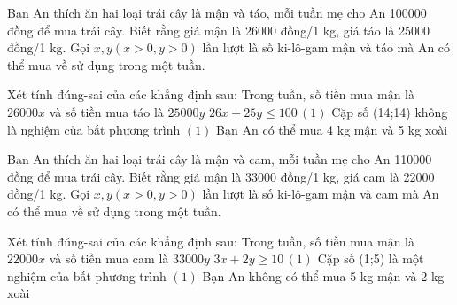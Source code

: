 \begin{ex}
 Bạn An thích ăn hai loại trái cây là mận và táo, mỗi tuần mẹ cho An 100000 đồng để mua trái cây. Biết rằng giá mận là 26000 đồng/1 kg, giá táo là 25000 đồng/1 kg. Gọi $x, y (x>0, y>0)$ lần lượt là số ki-lô-gam mận và táo mà An có thể mua về sử dụng trong một tuần.

 Xét tính đúng-sai của các khẳng định sau:
\choiceTFt
{ \True Trong tuần, số tiền mua mận là ${26000x}$ và số tiền mua táo là ${25000y}$ }
   { \True $26 x + 25 y\le 100 \, (1)$ }
     { \True  Cặp số (14;14) không là  nghiệm của bất phương trình $(1)$ }
    { Bạn An có thể mua 4 kg mận và 5 kg xoài }
\end{ex}

\begin{ex}
 Bạn An thích ăn hai loại trái cây là mận và cam, mỗi tuần mẹ cho An 110000 đồng để mua trái cây. Biết rằng giá mận là 33000 đồng/1 kg, giá cam là 22000 đồng/1 kg. Gọi $x, y (x>0, y>0)$ lần lượt là số ki-lô-gam mận và cam mà An có thể mua về sử dụng trong một tuần.

 Xét tính đúng-sai của các khẳng định sau:
\choiceTFt
{ Trong tuần, số tiền mua mận là ${22000x}$ và số tiền mua cam là ${33000y}$ }
   { $3 x + 2 y\ge 10 \, (1)$ }
     { Cặp số (1;5) là một nghiệm của bất phương trình $(1)$ }
    { \True  Bạn An không có thể mua 5 kg mận và 2 kg xoài }
\end{ex}

